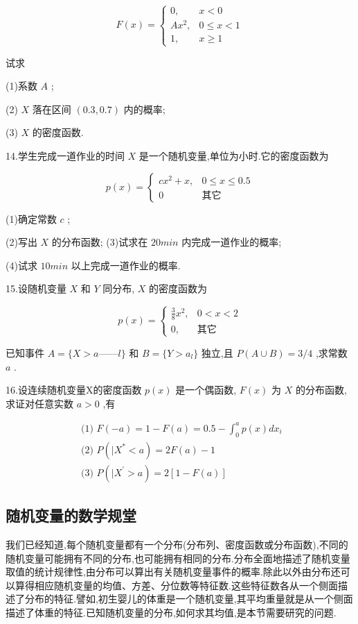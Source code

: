\[ 
F(x)=\left\{\begin{array}{ll}
{0,} & {x<0} \\ 
{A x^{2},} & {0 \leqslant x<1} \\ 
{1,} & {x \geqslant 1}
\end{array}\right.
\]

试求

(1)系数 $ A $ ;

(2) $ X $ 落在区间 $ (0.3,0.7) $ 内的概率;

(3) $ X $ 的密度函数.

14.学生完成一道作业的时间 $ X $ 是一个随机变量,单位为小时.它的密度函数为

\[ 
p(x)=\left\{\begin{array}{ll}
{c x^{2}+x,} & {0 \leqslant x \leqslant 0.5} \\ 
{0}&{\text{其它}}\end{array}\right.
\]

(1)确定常数 $ c $ ;

(2)写出 $ X $ 的分布函数;
(3)试求在 $ 20min $ 内完成一道作业的概率;

(4)试求 $ 10min $ 以上完成一道作业的概率.

15.设随机变量 $ X $ 和 $ Y $ 同分布, $ X $ 的密度函数为

\[ 
p(x)=\left\{\begin{array}{ll}
{\frac{3}{8} x^{2},} & {0<x<2} \\ 
{0,} & {\text{其它}}
\end{array}\right.
\]

已知事件 $ A=\{X>a——l\} $ 和 $ B=\{Y>a_l\} $ 独立,且 $ P(A \cup B)=3 / 4 $ ,求常数 $ a $ .

16.设连续随机变量X的密度函数 $ p(x) $ 是一个偶函数, $ F(x) $ 为 $ X $ 的分布函数,求证对任意实数 $ a>0 $ ,有

\[ 
\begin{array}{l}{\text { (1) } F(-a)=1-F(a)=0.5-\int_{0}^{a} p(x) d x_{i}} \\ {\text { (2) } P\left( | X^{*}<a\right)=2 F(a)-1} \\ {\text { (3) } P\left( | X^{\prime}>a\right)=2[1-F(a)]}\end{array}
\]

\subsection{随机变量的数学规堂}

我们已经知道,每个随机变量都有一个分布(分布列、密度函数或分布函数),不同的随机变量可能拥有不同的分布,也可能拥有相同的分布.分布全面地描述了随机变量取值的统计规律性,由分布可以算出有关随机变量事件的概率.除此以外由分布还可以算得相应随机变量的均值、方差、分位数等特征数.这些特征数各从一个侧面描述了分布的特征.譬如,初生婴儿的体重是一个随机变量,其平均重量就是从一个侧面描述了体重的特征.已知随机变量的分布,如何求其均值,是本节需要研究的问题.

